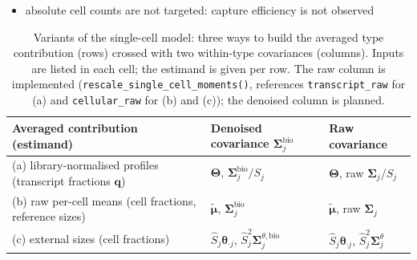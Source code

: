 \begin{itemize}
        \begin{equation}
          \boldsymbol{y}_{\cdot i}\mid\boldsymbol{q}_{\cdot i}\sim\mathcal{N}_{G}\Bigl(L_{i}\boldsymbol{\Theta}\boldsymbol{q}_{\cdot i},\;
          \kappa_{i}\sum_{j}q_{ji}\frac{\boldsymbol{\Sigma}_{W,j}}{S_{j}}\Bigr)
          \label{eq:sc-model-transcript}
        \end{equation}
        since \(\boldsymbol{\Theta}\boldsymbol{q}_{\cdot i}=\tilde{\boldsymbol{\mu}}\boldsymbol{p}_{\cdot i}/\sum_{\ell}p_{\ell i}S_{\ell}\) and
        \(\sum_{j}q_{ji}\boldsymbol{\Sigma}_{W,j}/S_{j}=\boldsymbol{S}_{W}(\boldsymbol{p}_{\cdot i})/\sum_{\ell}p_{\ell i}S_{\ell}\); the covariance is
        weighted by \(q_{ji}\) only through the per-transcript covariances \(\boldsymbol{\Sigma}_{W,j}/S_{j}\);
        \eqref{eq:sc-model-transcript} and \eqref{eq:sc-model} are one model in two parametrisations, so the
        maximum-likelihood estimates correspond (\(\hat{\boldsymbol{p}}_{\cdot i}\) is the conversion of \(\hat{\boldsymbol{q}}_{\cdot i}\))
        and (a) needs no size, at the price of returning transcript fractions
        \label{app:sc-transcript}
  \item absolute cell counts are not targeted: capture efficiency is not observed
\end{itemize}

\begin{table}[ht]
  \centering
  \small
  \caption{Variants of the single-cell model: three ways to build the averaged type contribution (rows) crossed
    with two within-type covariances (columns). Inputs are listed in each cell; the estimand is given per row. The raw
    column is implemented (\texttt{rescale\_single\_cell\_moments()}, references \texttt{transcript\_raw} for (a) and
    \texttt{cellular\_raw} for (b) and (c)); the denoised column is planned.}
  \label{tab:sc-factorial}
  \begin{tabular}{@{}>{\raggedright\arraybackslash}p{}>{\raggedright\arraybackslash}p{}>{\raggedright\arraybackslash}p{}@{}}
    \toprule
    Averaged contribution (estimand) & Denoised covariance \(\boldsymbol{\Sigma}^{\mathrm{bio}}_{j}\) & Raw covariance \\
    \midrule
    (a) library-normalised profiles (transcript fractions \(\boldsymbol{q}\)) & \(\boldsymbol{\Theta}\), \(\boldsymbol{\Sigma}^{\mathrm{bio}}_{j}/S_{j}\) &
      \(\boldsymbol{\Theta}\), raw \(\boldsymbol{\Sigma}_{j}/S_{j}\) \\
    (b) raw per-cell means (cell fractions, reference sizes) & \(\tilde{\boldsymbol{\mu}}\), \(\boldsymbol{\Sigma}^{\mathrm{bio}}_{j}\) & \(\tilde{\boldsymbol{\mu}}\),
      raw \(\boldsymbol{\Sigma}_{j}\) \\
    (c) external sizes (cell fractions) & \(\hat S_{j}\boldsymbol{\theta}_{\cdot j}\), \(\hat S_{j}^{2}\boldsymbol{\Sigma}^{\theta,\mathrm{bio}}_{j}\) &
      \(\hat S_{j}\boldsymbol{\theta}_{\cdot j}\), \(\hat S_{j}^{2}\boldsymbol{\Sigma}^{\theta}_{j}\) \\
    \bottomrule
  \end{tabular}
\end{table}


